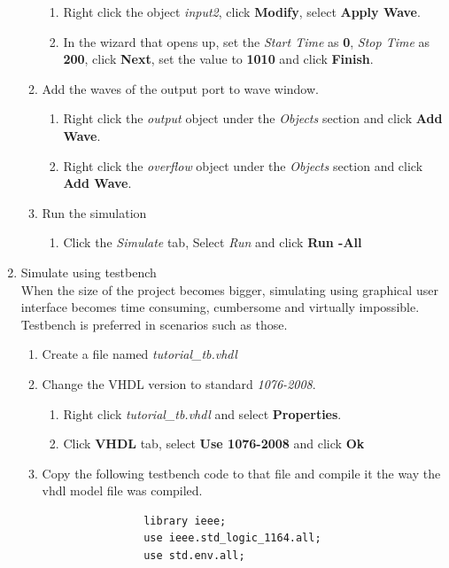 \documentclass{article}
\begin{document}
\begin{enumerate}
\begin{enumerate}
\begin{enumerate}
				\item Right click the object \textit{input2}, click \textbf{Modify}, select \textbf{Apply Wave}.
				\item In the wizard that opens up, set the \textit{Start Time} as \textbf{0}, \textit{Stop Time} as \textbf{200}, click \textbf{Next}, set the value to \textbf{1010} and click \textbf{Finish}.
			\end{enumerate}
			\item Add the waves of the output port to wave window.
			\begin{enumerate}
				\item Right click the \textit{output} object under the \textit{Objects} section and click \textbf{Add Wave}.
				\item Right click the \textit{overflow} object under the \textit{Objects} section and click \textbf{Add Wave}.
			\end{enumerate}
			\item Run the simulation
			\begin{enumerate}
				\item Click the \textit{Simulate} tab, Select \textit{Run} and click \textbf{Run -All}
			\end{enumerate}
		\end{enumerate}
		\item Simulate using testbench \\
		When the size of the project becomes bigger, simulating using graphical user interface becomes time consuming, cumbersome and virtually impossible. Testbench is preferred in scenarios such as those.
		\begin{enumerate}
			\item Create a file named \textit{tutorial\_tb.vhdl}
			\item Change the VHDL version to standard \textit{1076-2008}.
			\begin{enumerate}
				\item Right click \textit{tutorial\_tb.vhdl} and select \textbf{Properties}.
				\item Click \textbf{VHDL} tab, select \textbf{Use 1076-2008} and click \textbf{Ok}
			\end{enumerate}
			\item Copy the following testbench code to that file and compile it the way the vhdl model file was compiled.
			
			\begin{lstlisting}
				library ieee;
				use ieee.std_logic_1164.all;
				use std.env.all;
				

\end{lstlisting}
\end{enumerate}
\end{enumerate}
\end{document}

